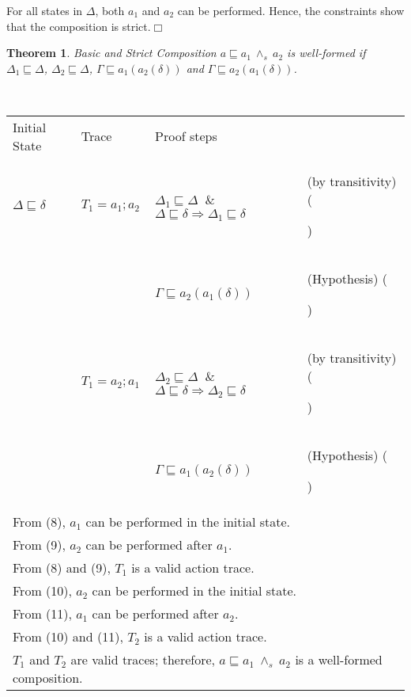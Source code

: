 \documentclass[12pt,journal,letterpaper,onecolumn]{IEEEtran}
\newcounter{myCounter}
\renewcommand{\themyCounter}{\arabic{myCounter}\addtocounter{myCounter}{1}}
\newtheorem{theorem}{Theorem}[section]
\begin{document}
For all states in $\Delta$, both $a_1$ and $a_2$ can be performed.
Hence, the constraints show that the composition is
strict.\hfill$\Box$


\begin{theorem}
Basic and Strict Composition $a\sqsubseteq a_1 ~\wedge_s~ a_2$  is
well-formed if $\Delta_1 \sqsubseteq \Delta$, $\Delta_2 \sqsubseteq
\Delta$, $\Gamma  \sqsubseteq a_1(a_2(\delta))$ and $\Gamma
\sqsubseteq a_2(a_1(\delta))$.
\label{theorem:basicstrictconjunction}\end{theorem}
\\
\begin{minipage}{6in} \begin{center}
\begin{tabular}{llp{7.5cm}p{3.8cm}}
Initial State & Trace &  Proof steps & \\
$\Delta \sqsubseteq \delta$ & $T_1 = a_1;a_2$ & $\Delta_1 \sqsubseteq \Delta $ $~\&~$ $ \Delta \sqsubseteq \delta \Rightarrow \Delta_1 \sqsubseteq \delta$& (by transitivity) \hfill(\themyCounter)\\
& & $\Gamma \sqsubseteq a_2(a_1(\delta))$& (Hypothesis) \hfill(\themyCounter)\\ & $T_1 = a_2;a_1$ & $\Delta_2 \sqsubseteq \Delta $ $~\&~$ $ \Delta \sqsubseteq \delta \Rightarrow \Delta_2 \sqsubseteq \delta$& (by transitivity) \hfill(\themyCounter)\\
& & $\Gamma \sqsubseteq a_1(a_2(\delta))$& (Hypothesis) \hfill(\themyCounter)\\ \multicolumn{4}{l}{From (8), $a_1$ can be performed in the initial state.}\\
\multicolumn{4}{l}{From (9), $a_2$ can be performed after $a_1$.}\\
\multicolumn{4}{l}{From (8) and (9), $T_1$ is a valid action trace.}\\
\multicolumn{4}{l}{From (10), $a_2$ can be performed in the initial state.}\\
\multicolumn{4}{l}{From (11), $a_1$ can be performed after $a_2$.} \\
\multicolumn{4}{l}{From (10) and (11), $T_2$ is a valid action trace.}\\
\multicolumn{4}{l}{$T_1$ and $T_2$ are valid traces; therefore, $a\sqsubseteq a_1 ~\wedge_s~ a_2$ is a well-formed composition.}\hfill$\Box$\\
\end{tabular}
\end{center}
\end{minipage}\\
\end{document}
